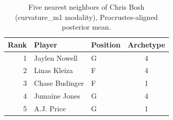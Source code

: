 \begin{table}[htbp]
  \centering\small
  \begin{tabular}{rllc}
    \toprule
    Rank & Player & Position & Archetype \\
    \midrule
    1 & Jaylen Nowell & G & 4 \\
    2 & Linas Kleiza & F & 4 \\
    3 & Chase Budinger & F & 1 \\
    4 & Jumaine Jones & G & 4 \\
    5 & A.J. Price & G & 1 \\
    \bottomrule
  \end{tabular}
  \caption{Five nearest neighbors of Chris Bosh (curvature_m1 modality), Procrustes-aligned posterior mean.}
  \label{tab:Chris_Bosh_neighbors_curvature_m1}
\end{table}

